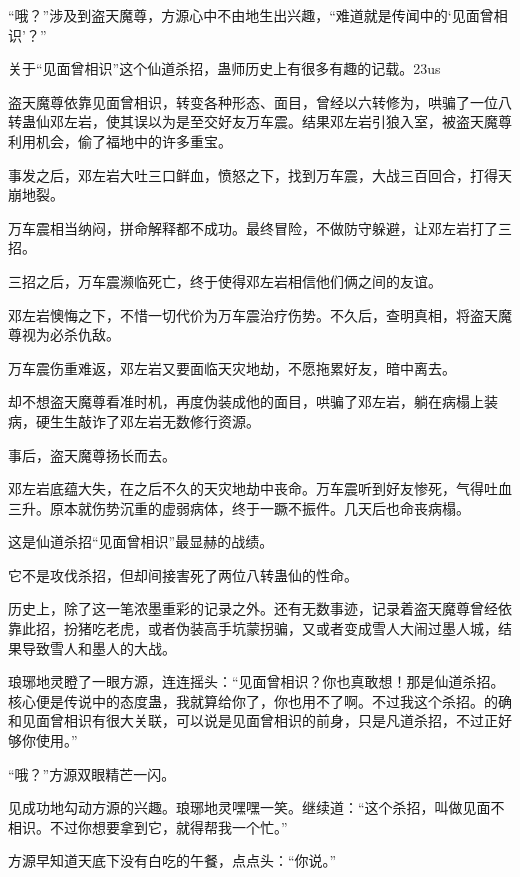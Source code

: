 
\begin{this_body}

“哦？”涉及到盗天魔尊，方源心中不由地生出兴趣，“难道就是传闻中的‘见面曾相识’？”

关于“见面曾相识”这个仙道杀招，蛊师历史上有很多有趣的记载。23us

盗天魔尊依靠见面曾相识，转变各种形态、面目，曾经以六转修为，哄骗了一位八转蛊仙邓左岩，使其误以为是至交好友万车震。结果邓左岩引狼入室，被盗天魔尊利用机会，偷了福地中的许多重宝。

事发之后，邓左岩大吐三口鲜血，愤怒之下，找到万车震，大战三百回合，打得天崩地裂。

万车震相当纳闷，拼命解释都不成功。最终冒险，不做防守躲避，让邓左岩打了三招。

三招之后，万车震濒临死亡，终于使得邓左岩相信他们俩之间的友谊。

邓左岩懊悔之下，不惜一切代价为万车震治疗伤势。不久后，查明真相，将盗天魔尊视为必杀仇敌。

万车震伤重难返，邓左岩又要面临天灾地劫，不愿拖累好友，暗中离去。

却不想盗天魔尊看准时机，再度伪装成他的面目，哄骗了邓左岩，躺在病榻上装病，硬生生敲诈了邓左岩无数修行资源。

事后，盗天魔尊扬长而去。

邓左岩底蕴大失，在之后不久的天灾地劫中丧命。万车震听到好友惨死，气得吐血三升。原本就伤势沉重的虚弱病体，终于一蹶不振件。几天后也命丧病榻。

这是仙道杀招“见面曾相识”最显赫的战绩。

它不是攻伐杀招，但却间接害死了两位八转蛊仙的性命。

历史上，除了这一笔浓墨重彩的记录之外。还有无数事迹，记录着盗天魔尊曾经依靠此招，扮猪吃老虎，或者伪装高手坑蒙拐骗，又或者变成雪人大闹过墨人城，结果导致雪人和墨人的大战。

琅琊地灵瞪了一眼方源，连连摇头：“见面曾相识？你也真敢想！那是仙道杀招。核心便是传说中的态度蛊，我就算给你了，你也用不了啊。不过我这个杀招。的确和见面曾相识有很大关联，可以说是见面曾相识的前身，只是凡道杀招，不过正好够你使用。”

“哦？”方源双眼精芒一闪。

见成功地勾动方源的兴趣。琅琊地灵嘿嘿一笑。继续道：“这个杀招，叫做见面不相识。不过你想要拿到它，就得帮我一个忙。”

方源早知道天底下没有白吃的午餐，点点头：“你说。”


\end{this_body}
